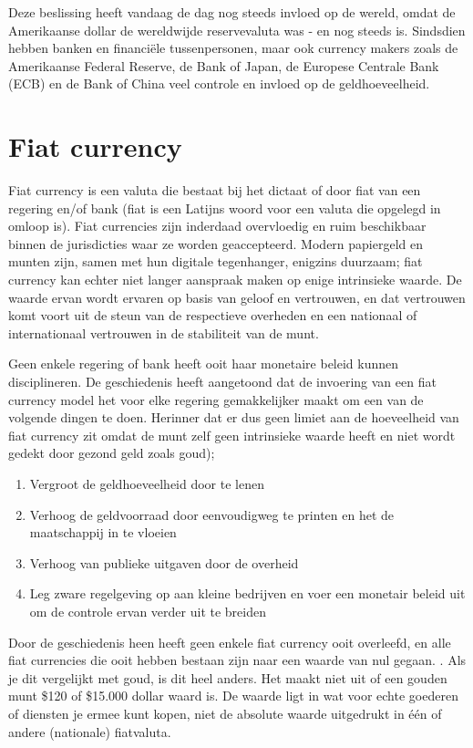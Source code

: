 Deze beslissing heeft vandaag de dag nog steeds invloed op de wereld, omdat de Amerikaanse dollar de wereldwijde reservevaluta was - en nog steeds is. Sindsdien hebben banken en financi\"ele tussenpersonen, maar ook currency makers zoals de Amerikaanse Federal Reserve, de Bank of Japan, de Europese Centrale Bank (ECB) en de Bank of China veel controle en invloed op de geldhoeveelheid. 

\section{Fiat currency}       
Fiat currency is een valuta die bestaat bij het dictaat of door fiat van een regering en/of bank (fiat is een Latijns woord voor een valuta die opgelegd in omloop is). Fiat currencies zijn inderdaad overvloedig en ruim beschikbaar binnen de jurisdicties waar ze worden geaccepteerd. Modern papiergeld en munten zijn, samen met hun digitale tegenhanger, enigzins duurzaam; fiat currency kan echter niet langer aanspraak maken op enige intrinsieke waarde. De waarde ervan wordt ervaren op basis van geloof en vertrouwen, en dat vertrouwen komt voort uit de steun van de respectieve overheden en een nationaal of internationaal vertrouwen in de stabiliteit van de munt.

Geen enkele regering of bank heeft ooit haar monetaire beleid kunnen disciplineren. De geschiedenis heeft aangetoond dat de invoering van een fiat currency model het voor elke regering gemakkelijker maakt om een van de volgende dingen te doen. Herinner dat er dus geen limiet aan de hoeveelheid van fiat currency zit omdat de munt zelf geen intrinsieke waarde heeft en niet wordt gedekt door gezond geld zoals goud);

\begin{enumerate}[label=(\alph*)]
    \setlength\itemsep{0em}
    \item Vergroot de geldhoeveelheid door te lenen
    \item Verhoog de geldvoorraad door eenvoudigweg te printen en het de maatschappij in te vloeien
    \item Verhoog van publieke uitgaven door de overheid
    \item Leg zware regelgeving op aan kleine bedrijven en voer een monetair beleid uit om de controle ervan verder uit te breiden
\end{enumerate}

\noindent Door de geschiedenis heen heeft geen enkele fiat currency ooit overleefd, en alle fiat currencies die ooit hebben bestaan zijn naar een waarde van nul gegaan. \parencite{thebigreset}. Als je dit vergelijkt met goud, is dit heel anders. Het maakt niet uit of een gouden munt \$120 of \$15.000 dollar waard is. De waarde ligt in wat voor echte goederen of diensten je ermee kunt kopen, niet de absolute waarde uitgedrukt in \'e\'en of andere (nationale) fiatvaluta. 


